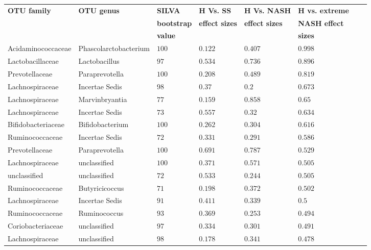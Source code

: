 \begin{table}[!ht]
\begin{tiny}
\begin{tabular}{|l|l|l|l|l|l|l|l|}
\hline
\bf{OTU family} & \bf{OTU genus} & \bf{SILVA} &\bf{H Vs. SS} & \bf{H Vs. NASH} & \bf{H vs. extreme} \\
& & \bf{bootstrap} & \bf{effect sizes} & \bf{effect sizes} & \bf{NASH effect} \\
& & \bf{value} & & & \bf{sizes}\\ \hline
Acidaminococcaceae & Phascolarctobacterium & $100$ & $0.122$ & $0.407$ & $0.998$ \\ \hline
Lactobacillaceae & Lactobacillus & $97$ & $0.534$ & $0.736$ & $0.896$ \\ \hline
Prevotellaceae & Paraprevotella & $100$ & $0.208$ & $0.489$ & $0.819$ \\ \hline
Lachnospiraceae & Incertae Sedis & $98$ & $0.37$ & $0.2$ & $0.673$ \\ \hline
Lachnospiraceae & Marvinbryantia & $77$ & $0.159$ & $0.858$ & $0.65$ \\ \hline
Lachnospiraceae & Incertae Sedis & $73$ & $0.557$ & $0.32$ & $0.634$ \\ \hline
Bifidobacteriaceae & Bifidobacterium & $100$ & $0.262$ & $0.304$ & $0.616$ \\ \hline
Ruminococcaceae & Incertae Sedis & $72$ & $0.331$ & $0.291$ & $0.586$ \\ \hline
Prevotellaceae & Paraprevotella & $100$ & $0.691$ & $0.787$ & $0.529$ \\ \hline
Lachnospiraceae & unclassified & $100$ & $0.371$ & $0.571$ & $0.505$ \\ \hline
unclassified & unclassified & $72$ & $0.533$ & $0.244$ & $0.505$ \\ \hline
Ruminococcaceae & Butyricicoccus & $71$ & $0.198$ & $0.372$ & $0.502$ \\ \hline
Lachnospiraceae & Incertae Sedis & $91$ & $0.411$ & $0.339$ & $0.5$ \\ \hline
Ruminococcaceae & Ruminococcus & $93$ & $0.369$ & $0.253$ & $0.494$ \\ \hline
Coriobacteriaceae & unclassified & $97$ & $0.334$ & $0.301$ & $0.491$ \\ \hline
Lachnospiraceae & unclassified & $98$ & $0.178$ & $0.341$ & $0.478$ \\ \hline

\end{tabular}
\end{tiny}
\end{table}
